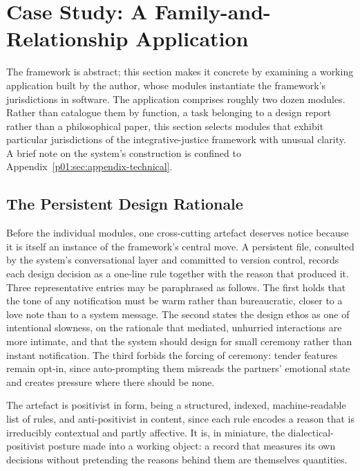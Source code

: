 \documentclass[11pt,a4paper]{article}
\begin{document}
\section{Case Study: A Family-and-Relationship Application}\label{p01:sec:casestudy}

The framework is abstract; this section makes it concrete by examining a working application built by the author, whose modules instantiate the framework's jurisdictions in software. The application comprises roughly two dozen modules. Rather than catalogue them by function, a task belonging to a design report rather than a philosophical paper, this section selects modules that exhibit particular jurisdictions of the integrative-justice framework with unusual clarity. A brief note on the system's construction is confined to Appendix~\ref{p01:sec:appendix-technical}.

\subsection{The Persistent Design Rationale}\label{p01:sec:memory}

Before the individual modules, one cross-cutting artefact deserves notice because it is itself an instance of the framework's central move. A persistent file, consulted by the system's conversational layer and committed to version control, records each design decision as a one-line rule together with the reason that produced it. Three representative entries may be paraphrased as follows. The first holds that the tone of any notification must be warm rather than bureaucratic, closer to a love note than to a system message. The second states the design ethos as one of intentional slowness, on the rationale that mediated, unhurried interactions are more intimate, and that the system should design for small ceremony rather than instant notification. The third forbids the forcing of ceremony: tender features remain opt-in, since auto-prompting them misreads the partners' emotional state and creates pressure where there should be none.

\noindent The artefact is positivist in form, being a structured, indexed, machine-readable list of rules, and anti-positivist in content, since each rule encodes a reason that is irreducibly contextual and partly affective. It is, in miniature, the dialectical-positivist posture made into a working object: a record that measures its own decisions without pretending the reasons behind them are themselves quantities.
\end{document}
